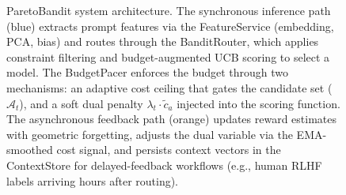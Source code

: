 \begin{figure}[htbp]
{
}
\caption{ParetoBandit system architecture. The synchronous inference path (blue) extracts prompt features via the FeatureService (embedding, PCA, bias) and routes through the BanditRouter, which applies constraint filtering and budget-augmented UCB scoring to select a model. The BudgetPacer enforces the budget through two mechanisms: an adaptive cost ceiling that gates the candidate set ($\mathcal{A}_t$), and a soft dual penalty $\lambda_t \cdot \tilde{c}_a$ injected into the scoring function. The asynchronous feedback path (orange) updates reward estimates with geometric forgetting, adjusts the dual variable via the EMA-smoothed cost signal, and persists context vectors in the ContextStore for delayed-feedback workflows (e.g., human RLHF labels arriving hours after routing).}
\label{fig:architecture}
\end{figure}
